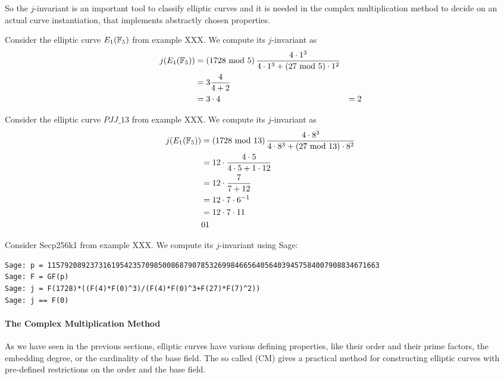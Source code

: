 So the $j$-invariant is an important tool to classify elliptic curves and it is needed in the complex multiplication method to decide on an actual curve instantiation, that implements abstractly chosen properties.

\begin{example} Consider the elliptic curve $E_1(\mathbb{F}_5)$ from example XXX. We compute its $j$-invariant as
\begin{align*}
j(E_1(\mathbb{F}_5)) &= \left(1728 \text{ mod } 5\right) \frac{4\cdot 1^3}{4\cdot 1^3+ (27 \text{ mod } 5)\cdot 1^2}\\
             &= 3 \frac{4}{4+ 2}\\
             &= 3\cdot 4
             & = 2
\end{align*}
\end{example}
\begin{example} Consider the elliptic curve $\mathit{PJJ\_13}$ from example XXX. We compute its $j$-invariant as
\begin{align*}
j(E_1(\mathbb{F}_5)) &= \left(1728 \text{ mod } 13\right) \frac{4\cdot 8^3}{4\cdot 8^3+ (27 \text{ mod } 13)\cdot 8^2}\\
             &= 12\cdot \frac{4\cdot 5}{4\cdot 5+ 1\cdot 12}\\
             &= 12\cdot \frac{7}{7+ 12}\\
             &= 12\cdot 7\cdot 6^{-1}\\
             &= 12\cdot 7\cdot 11\\
             &0 1 
\end{align*}
\end{example}
\begin{example}Consider Secp256k1 from example XXX. We compute its $j$-invariant using Sage: 
\begin{verbatim}
Sage: p = 115792089237316195423570985008687907853269984665640564039457584007908834671663
Sage: F = GF(p)
Sage: j = F(1728)*((F(4)*F(0)^3)/(F(4)*F(0)^3+F(27)*F(7)^2))
Sage: j == F(0)
\end{verbatim}
\end{example} 
\paragraph{The Complex Multiplication Method}
As we have seen in the previous sections, elliptic curves have various defining properties, like their order and their prime factors, the embedding degree, or the cardinality of the base field. The so called  (CM) gives a practical method for constructing elliptic curves with pre-defined restrictions on the order and the base field.

